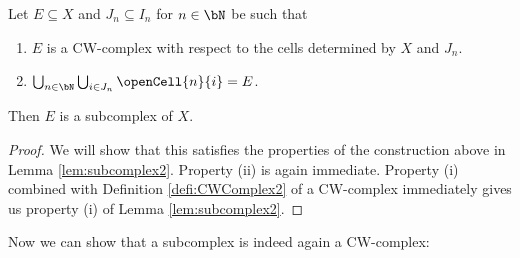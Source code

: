 \begin{lem}
    Let $E \subseteq X$ and $J_n \subseteq I_n$ for $n \in \bN$ be such that 
    \begin{enumerate}
        \item $E$ is a CW-complex with respect to the cells determined by $X$ and $J_n$.
        \item $\bigcup_{n \in \bN} \bigcup_{i \in J_n} \openCell{n}{i} = E$.
    \end{enumerate}
    Then $E$ is a subcomplex of $X$. 
    \href{https://github.com/scholzhannah/CWComplexes/blob/7be4872a05b534011cc969eb5b80a4b7f0bf57e2/CWcomplexes/subcomplex.lean#L54-L80}{\faExternalLink}
\end{lem}
\begin{proof}
    We will show that this satisfies the properties of the construction above in Lemma \ref{lem:subcomplex2}.
    Property (ii) is again immediate. 
    Property (i) combined with Definition \ref{defi:CWComplex2} of a CW-complex immediately gives us property (i) of Lemma \ref{lem:subcomplex2}.
\end{proof}

Now we can show that a subcomplex is indeed again a CW-complex: 

